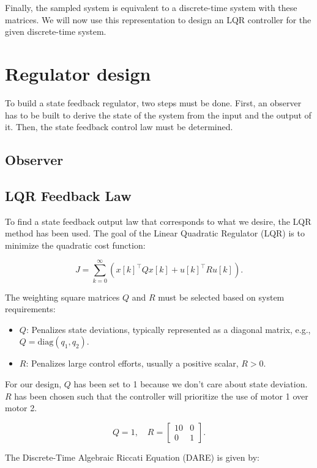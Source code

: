 Finally, the sampled system is equivalent to a discrete-time system with these matrices. We will now use this representation to design an LQR controller for the given discrete-time system.

\section{Regulator design}

To build a state feedback regulator, two steps must be done. First, an observer has to be built to derive the state of 
the system from the input and the output of it. Then, the state feedback control law must be determined.

\subsection{Observer}


\subsection{LQR Feedback Law}

To find a state feedback output law that corresponds to what we desire, the LQR method has been used.
The goal of the Linear Quadratic Regulator (LQR) is to minimize the quadratic cost function:

\[
J = \sum_{k=0}^\infty \left( x[k]^\top Q x[k] + u[k]^\top R u[k] \right).
\]

The weighting square matrices \( Q \) and \( R \) must be selected based on system requirements:

\begin{itemize}
    \item \( Q \): Penalizes state deviations, typically represented as a diagonal matrix, e.g., \( Q = \text{diag}(q_1, q_2) \).
    \item \( R \): Penalizes large control efforts, usually a positive scalar, \( R > 0 \).
\end{itemize}

For our design, $Q$ has been set to 1 because we don't care about state deviation. $R$ has been chosen such that the 
controller will prioritize the use of motor 1 over motor 2. 

\[
Q = 1, \quad
R = \begin{bmatrix}
10 & 0 \\
0 & 1
\end{bmatrix}.
\]

The Discrete-Time Algebraic Riccati Equation (DARE) is given by:

